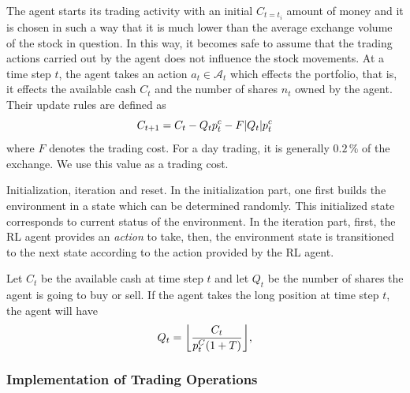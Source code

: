 \documentclass[twocolumn,aps,pra,superscriptaddress,nofootinbib,longbibliography]{revtex4-2}
\DeclarePairedDelimiter\floor{\lfloor}{\rfloor}
\begin{document}
The agent starts its trading activity with an initial \(C_{t=t_i}\) amount of money and it is chosen in such a way that it is much lower than the average exchange volume of the stock in question. In this way, it becomes safe to assume that the trading actions carried out by the agent does not influence the stock movements. At a time step \(t\), the agent takes an action \(a_t \in \mathcal{A}_t\) which effects the portfolio, that is, it effects the available cash \(C_t\) and the number of shares \(n_t\) owned by the agent. Their update rules are defined as
\begin{equation}\label{eq:portfolio-update}
    C_{t+1} = C_t - Q_t p_{t}^{c} - F \abs{Q_t} p_{t}^{c}
\end{equation}
where \(F\) denotes the trading cost. For a day trading, it is generally \(0.2\,\%\) of the exchange. We use this value as a trading cost.





Initialization, iteration and reset. In the initialization part, one first builds the environment in a state which can be determined randomly. This initialized state corresponds to current status of the environment. In the iteration part, first, the RL agent provides an \textit{action} to take, then, the environment state is transitioned to the next state according to the action provided by the RL agent.






 








Let \(C_t\) be the available cash at time step \(t\) and let \(Q_t\) be the number of shares the agent is going to buy or sell. If the agent takes the long position at time step \(t\), the agent will have 
\begin{equation}
    Q_t = \floor*{\dfrac{C_{t}}{p_t^C (1 + T)}},
\end{equation} 


\subsubsection{Implementation of Trading Operations}
\end{document}
